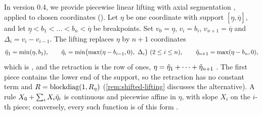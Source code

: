 In version 0.4, we provide piecewise linear lifting with axial segmentation \citet[Section~4.1]{GWK2015}, applied to chosen coordinates ().
Let $\eta$ be one coordinate with support $[\underline\eta, \overline\eta]$, and let $\underline\eta < b_1 < \dots < b_n < \overline\eta$ be breakpoints.
Set $v_0 = \underline\eta$, $v_i = b_i$, $v_{n+1} = \overline\eta$ and $\Delta_i = v_i - v_{i-1}$.
The lifting replaces $\eta$ by $n+1$ coordinates
\begin{equation}
\label{eq:axis-lifting}
\tilde\eta_1 = \min(\eta, b_1), \qquad
\tilde\eta_i = \min\bigl(\max(\eta - b_{i-1}, 0),\ \Delta_i\bigr) \ (2 \le i \le n), \qquad
\tilde\eta_{n+1} = \max(\eta - b_n, 0),
\end{equation}
which is \citet[(3)]{GWK2015}, and the retraction is the row of ones, $\eta = \tilde\eta_1 + \dots + \tilde\eta_{n+1}$ \citep[(4)]{GWK2015}.
The first piece contains the lower end of the support, so the retraction has no constant term and $R = \operatorname{blockdiag}(1, R_\eta)$
(\cref{rem:shifted-lifting} discusses the alternative).
A rule $X_0 + \sum_i X_i\tilde\eta_i$ is continuous and piecewise affine in $\eta$, with slope $X_i$ on the $i$-th piece;
conversely, every such function is of this form \citep[Section~4.1]{GWK2015}.

